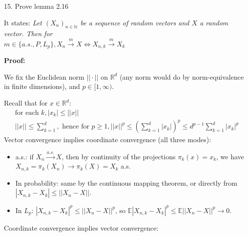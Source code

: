 \documentclass[10pt]{article}
\begin{document}
\newpage

15. Prove lemma 2.16

It states: \textit{Let $(X_n)_{n \in \mathbb{N}}$ be a sequence of random vectors and $X$ a random vector. Then for \\$m \in \{a.s., P, L_p\}, X_n \xrightarrow{m} X \iff X_{n, k}\xrightarrow{m} X_k$}

\textbf{Proof:}

We fix the Euclidean norm $||\cdot||$ on $\mathbb{R}^d$ (any norm would do by norm-equivalence in finite dimensions), and $p \in [1, \infty)$.

Recall that for $x \in \mathbb{R}^d$:
\begin{gather*}
    \text{for each }k, |x_k| \le ||x||\\
    ||x|| \le \sum_{k = 1}^{d}, \text{ hence for } p \ge 1, ||x||^p \le \left(\sum_{k = 1}^{d}|x_k|\right)^p \le d^{p - 1}\sum_{k = 1}^{d}|x_k|^p
\end{gather*}
Vector convergence implies coordinate convergence (all three modes):
\begin{itemize}
    \item a.s.: if $X_n \xrightarrow{a.s.} X$, then by continuity of the projections $\pi_k(x) = x_k$, we have \\$X_{n, k} = \pi_k(X_n) \to \pi_k(X) = X_k$ a.s.
    \item In probability: same by the continuous mapping theorem, or directly from $|X_{n, k} - X_k| \le ||X_n - X||$.
    \item In $L_p$: $|X_{n, k} - X_k|^p \le ||X_n - X||^p$, so $\mathbb{E}|X_{n, k} - X_k|^p \le \mathbb{E}||X_n - X||^p \to 0$.
\end{itemize}
Coordinate convergence implies vector convergence: 
\end{document}
